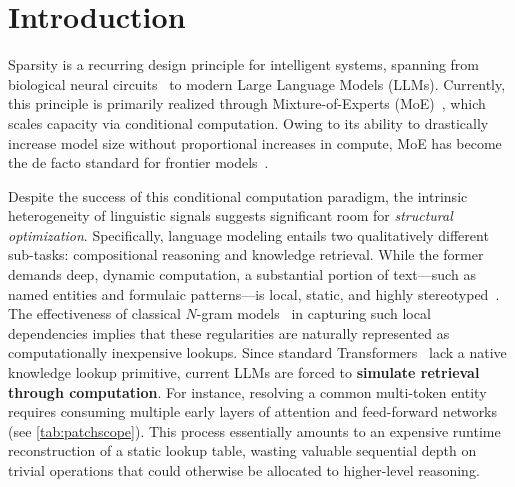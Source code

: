 \section{Introduction}
\label{sec:intro}
Sparsity is a recurring design principle for intelligent systems, spanning from biological neural circuits~\citep{olshausen1997sparse,lennie2003cost} to modern Large Language Models (LLMs). Currently, this principle is primarily realized through Mixture-of-Experts (MoE)~\citep{shazeer2017outrageously,dai2024deepseekmoe}, which scales capacity via conditional computation. 
Owing to its ability to drastically increase model size without proportional increases in compute, MoE has become the de facto standard for frontier models~\citep{guo2025deepseek,comanici2025gemini,team2025kimi}.


Despite the success of this conditional computation paradigm, the intrinsic heterogeneity of linguistic signals suggests significant room for \textit{structural optimization}. Specifically, language modeling entails two qualitatively different sub-tasks: compositional reasoning and knowledge retrieval. While the former demands deep, dynamic computation, a substantial portion of text—such as named entities and formulaic patterns—is local, static, and highly stereotyped~\citep{erman2000idiom,constant2017survey}. The effectiveness of classical $N$-gram models~\citep{liu2024infini,nguyen2024understanding,brants-etal-2007-large} in capturing such local dependencies implies that these regularities are naturally represented as computationally inexpensive lookups. Since standard Transformers~\citep{vaswani2017attention} lack a native knowledge lookup primitive, current LLMs are forced to \textbf{simulate retrieval through computation}. For instance, resolving a common multi-token entity requires consuming multiple early layers of attention and feed-forward networks~\citep{ghandeharioun2024patchscopes,DBLP:conf/coling/JinYHZWH0MMDYDZ25} (see \autoref{tab:patchscope}). This process essentially amounts to an expensive runtime reconstruction of a static lookup table, wasting valuable sequential depth on trivial operations that could otherwise be allocated to higher-level reasoning.

